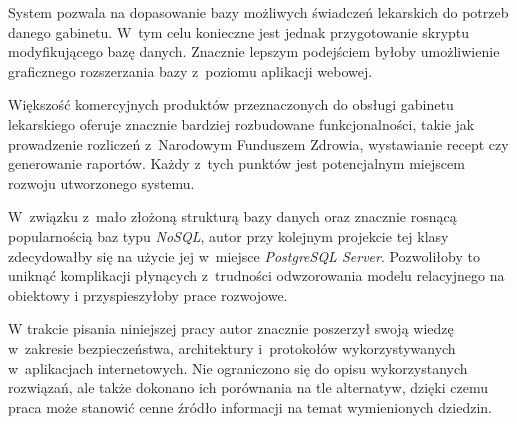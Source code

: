 \documentclass[11pt]{aghdpl}
\begin{document}
System pozwala na dopasowanie bazy możliwych świadczeń lekarskich do potrzeb danego gabinetu. W~tym celu konieczne jest jednak przygotowanie skryptu modyfikującego bazę danych. Znacznie lepszym podejściem byłoby umożliwienie graficznego rozszerzania bazy z~poziomu aplikacji webowej.

Większość komercyjnych produktów przeznaczonych do obsługi gabinetu lekarskiego oferuje znacznie bardziej rozbudowane funkcjonalności, takie jak prowadzenie rozliczeń z~Narodowym Funduszem Zdrowia, wystawianie recept czy generowanie raportów. Każdy z~tych punktów jest potencjalnym miejscem rozwoju utworzonego systemu.

W~związku z~mało złożoną strukturą bazy danych oraz znacznie rosnącą popularnością baz typu \emph{NoSQL}, autor przy kolejnym projekcie tej klasy zdecydowałby się na użycie jej w~miejsce \emph{PostgreSQL Server}. Pozwoliłoby to uniknąć komplikacji płynących z~trudności odwzorowania modelu relacyjnego na obiektowy i przyspieszyłoby prace rozwojowe.

W trakcie pisania niniejszej pracy autor znacznie poszerzył swoją wiedzę w~zakresie bezpieczeństwa, architektury i~protokołów wykorzystywanych w~aplikacjach internetowych. Nie ograniczono się do opisu wykorzystanych rozwiązań, ale także dokonano ich porównania na tle alternatyw, dzięki czemu praca może stanowić cenne źródło informacji na temat wymienionych dziedzin.

% 
% 



\end{document}
